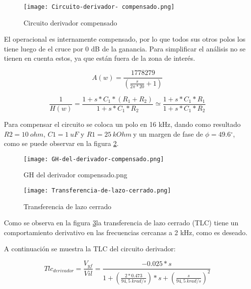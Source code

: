 \begin{figure}[H]
	\centering
	\texttt{[image: Circuito-derivador- compensado.png]}
	\caption{Circuito derivador compensado}
	\label{fig:img_Circuito_derivador_compensado}
\end{figure}

\noindent El operacional es internamente compensado, por lo que todos sus otros polos los tiene luego de el cruce por 0 dB de la ganancia. Para simplificar el an\'{a}lisis no se tienen en cuenta estos, ya que est\'{a}n fuera de la zona de inter\'{e}s.

\begin{equation} \label{eq_Aw_1}
	A(w)=\frac{1778279}{(\frac{s}{2\pi *20}+1)}
\end{equation} 

\begin{equation} \label{eq_Aw_2}
	\frac{1}{H(w)}=\frac{1+s*C_1*(R_1+R_2)}{1+s*C_1*R_2}\simeq \frac{1+s*C_1*R_1}{1+s*C_1*R_2}
\end{equation}

\noindent Para compensar el circuito se coloca un polo en 16 kHz, dando como resultado $R2=10\ ohm$, $C1=1\ uF$ y $R1=25\ kOhm\ $y un margen de fase de $\phi =49.6{}^\circ $, como se puede observar en la figura \ref{fig:img_GH del derivador compensado}.

\begin{figure}[H]
	\centering
	\texttt{[image: GH-del-derivador-compensado.png]}
	\caption{GH del derivador compensado.png}
	\label{fig:img_GH del derivador compensado}
\end{figure}

\begin{figure}[H]
	\centering
	\texttt{[image: Transferencia-de-lazo-cerrado.png]}
	\caption{Transferencia de lazo cerrado}
	\label{fig:img_Transferencia-de-lazo-cerrado}
\end{figure}

\noindent Como se observa en la figura \ref{fig:img_Transferencia-de-lazo-cerrado}la transferencia de lazo cerrado (TLC) tiene un comportamiento derivativo en las frecuencias cercanas a 2 kHz, como es deseado.

\noindent A continuaci\'{o}n se muestra la TLC del circuito derivador:
 
\begin{equation} \label{eq_Vyf-lineal}
	{Tlc}_{derivador}=\frac{V_{yf}}{Vil}=\frac{-0.025*s}{1+(\frac{2*0.473}{94,5\ krad/s})*s+(\frac{s}{94,5\ krad/s})^2}
\end{equation} 

